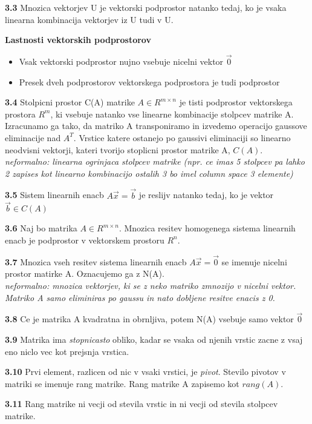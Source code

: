 \documentclass{article}
\begin{document}
\begin{multicols}{2}
\textbf{3.3} Mnozica vektorjev U je vektorski podprostor natanko tedaj, ko je vsaka linearna
kombinacija vektorjev iz U tudi v U.

\textbf{Lastnosti vektorskih podprostorov}
\begin{itemize}
    \item Vsak vektorski podprostor nujno vsebuje nicelni vektor $\vec{0}$
    \item Presek dveh podprostorov vektorskega podprostora je tudi podprostor
\end{itemize}

\textbf{3.4} Stolpicni prostor C(A) matrike $A \in R^{m \times n}$ je tisti podprostor
vektorskega prostora $R^{m}$, ki vsebuje natanko vse linearne kombinacije stolpcev matrike A.\\
Izracunamo ga tako, da matriko A transponiramo in izvedemo operacijo gaussove eliminacije nad $A^{T}$. Vrstice katere ostanejo po gaussivi eliminaciji
so linearno neodvisni vektorji, kateri tvorijo stoplicni prostor matrike A, $C(A)$.
\textit{neformalno: linearna ogrinjaca stolpcev matrike (npr. ce imas 5 stolpcev pa lahko 2 zapises kot linearno kombinacijo ostalih 3 bo imel column space 3 elemente)}

\textbf{3.5} Sistem linearnih enacb $A\vec{x} = \vec{b}$ je reslijv natanko tedaj, ko je vektor
$\vec{b} \in C(A)$

\textbf{3.6} Naj bo matrika $A \in R^{m \times n}$. Mnozica resitev homogenega sistema linearnih
enacb je podprostor v vektorskem prostoru $R^{n}$.

\textbf{3.7} Mnozica vseh resitev sistema linearnih enacb $A\vec{x} = \vec{0}$ se imenuje nicelni
prostor matirke A. Oznacujemo ga z N(A).\\
\textit{neformalno: mnozica vektorjev, ki se z neko matriko zmnozijo v nicelni vektor. Matriko A samo eliminiras po gaussu in nato dobljene resitve enacis z 0.}

\textbf{3.8} Ce je matrika A kvadratna in obrnljiva, potem N(A) vsebuje samo vektor $\vec{0}$

\textbf{3.9} Matrika ima \textit{stopnicasto} obliko, kadar se vsaka od njenih vrstic zacne z vsaj eno
niclo vec kot prejsnja vrstica.

\textbf{3.10} Prvi element, razlicen od nic v vsaki vrstici, je \textit{pivot}. Stevilo pivotov v matriki
se imenuje rang matrike. Rang matrike A zapisemo kot $rang(A)$.

\textbf{3.11} Rang matrike ni vecji od stevila vrstic in ni vecji od stevila stolpcev matrike.


\end{multicols}
\end{document}
